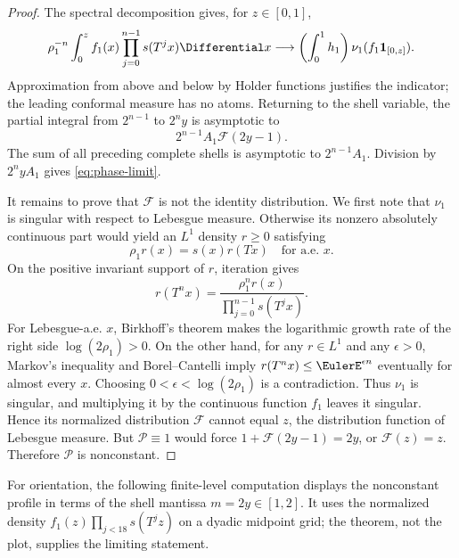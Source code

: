 \documentclass[11pt,oneside]{article}
\theoremstyle{definition}
\theoremstyle{remark}
\begin{document}
\begin{proof}
The spectral decomposition gives, for $z\in[0,1]$,
\[
 \rho_1^{-n}\int_0^z f_1(x)
 \prod_{j=0}^{n-1}s(T^jx)\Differential x
 \longrightarrow
 \left(\int_0^1h_1\right)\nu_1(f_1\mathbf1_{[0,z]}).
\]
Approximation from above and below by Holder functions justifies the indicator; the
leading conformal measure has no atoms.  Returning to the shell variable, the partial
integral from $2^{n-1}$ to $2^ny$ is asymptotic to
\[
 2^{n-1}A_1\mathscr F(2y-1).
\]
The sum of all preceding complete shells is asymptotic to $2^{n-1}A_1$.  Division by
$2^nyA_1$ gives \eqref{eq:phase-limit}.

It remains to prove that $\mathscr F$ is not the identity distribution.  We first note that
$\nu_1$ is singular with respect to Lebesgue measure.  Otherwise its nonzero absolutely
continuous part would yield an $L^1$ density $r\ge0$ satisfying
\begin{equation}
 \rho_1r(x)=s(x)r(Tx)
 \quad\text{for a.e. }x.
 \label{eq:conformal-density}
\end{equation}
On the positive invariant support of $r$, iteration gives
\[
 r(T^nx)=\frac{\rho_1^nr(x)}{\prod_{j=0}^{n-1}s(T^jx)}.
\]
For Lebesgue-a.e. $x$, Birkhoff's theorem makes the logarithmic growth rate of the right
side $\log(2\rho_1)>0$.  On the other hand, for any $r\in L^1$ and any $\epsilon>0$,
Markov's inequality and Borel--Cantelli imply
$r(T^nx)\le\EulerE^{\epsilon n}$ eventually for almost every $x$.  Choosing
$0<\epsilon<\log(2\rho_1)$ is a contradiction.  Thus $\nu_1$ is singular, and multiplying
it by the continuous function $f_1$ leaves it singular.  Hence its normalized distribution
$\mathscr F$ cannot equal $z$, the distribution function of Lebesgue measure.  But
$\mathscr P\equiv1$ would force
$1+\mathscr F(2y-1)=2y$, or $\mathscr F(z)=z$.  Therefore $\mathscr P$ is nonconstant.
\end{proof}

For orientation, the following finite-level computation displays the nonconstant profile in
terms of the shell mantissa $m=2y\in[1,2]$.  It uses the normalized density
$f_1(z)\prod_{j<18}s(T^jz)$ on a dyadic midpoint grid; the theorem, not the plot, supplies
the limiting statement.

\begin{center}
\end{center}
\end{document}
